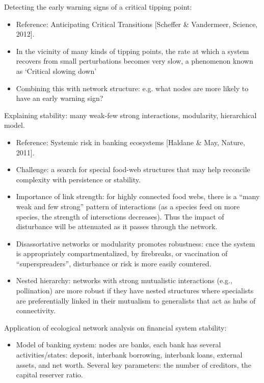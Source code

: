 \documentclass{report}
\begin{document}
\begin{enumerate}
Detecting the early warning signs of a critical tipping point: 
\begin{itemize}
\item Reference: Anticipating Critical Transitions [Scheffer \& Vandermeer, Science, 2012].
\item In the vicinity of many kinds of tipping points, the rate at which a system recovers from small perturbations becomes very slow, a phenomenon known as `Critical slowing down'
\item Combining this with network structure: e.g. what nodes are more likely to have an early warning sign? 
\end{itemize}

Explaining stability: many weak-few strong interactions, modularity, hierarchical model.
\begin{itemize}
\item Reference: Systemic risk in banking ecosystems [Haldane \& May, Nature, 2011]. 
\item Challenge: a search for special food-web structures that may help reconcile complexity with persistence or stability. 

\item Importance of link strength: for highly connected food webs, there is a ``many weak and few strong'' pattern of interactions (as a species feed on more species, the strength of intersctions decreases). Thus the impact of disturbance will be attenuated as it passes through the network. 

\item Disassortative networks or modularity promotes robustness: cnce the system is appropriately compartmentalized, by firebreaks, or vaccination of ``superspreaders'', disturbance or risk is more easily countered.

\item Nested hierarchy: networks with strong mutualistic interactions (e.g., pollination) are more robust if they have nested structures where specialists are preferentially linked in their mutualism to generalists that act as hubs of connectivity. 
\end{itemize}

Application of ecological network analysis on financial system stability: 
\begin{itemize}
\item Model of banking system: nodes are banks, each bank has several activities/states: deposit, interbank borrowing, interbank loans, external assets, and net worth. Several key parameters: the number of creditors, the capital reserver ratio. 


\end{itemize}
\end{enumerate}
\end{document}
